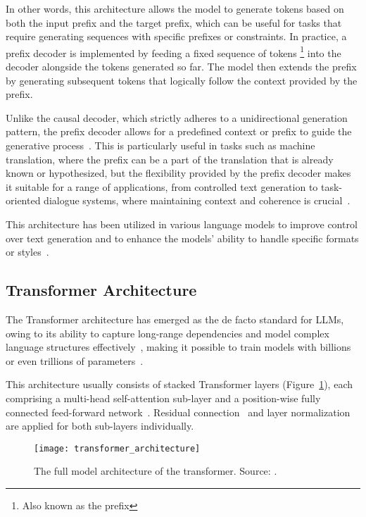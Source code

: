 In other words, this architecture allows the model to generate tokens based on both the input prefix and the target prefix, which can be useful for tasks that require generating sequences with specific prefixes or constraints.
In practice, a prefix decoder is implemented by feeding a fixed sequence of tokens \footnote{Also known as the prefix} into the decoder alongside the tokens generated so far.
The model then extends the prefix by generating subsequent tokens that logically follow the context provided by the prefix.

Unlike the causal decoder, which strictly adheres to a unidirectional generation pattern, the prefix decoder allows for a predefined context or prefix to guide the generative process~\cite{li2021prefixtuning}.
This is particularly useful in tasks such as machine translation, where the prefix can be a part of the translation that is already known or hypothesized, but the flexibility provided by the prefix decoder makes it suitable for a range of applications, from controlled text generation to task-oriented dialogue systems, where maintaining context and coherence is crucial~\cite{li2022ptuning}.

This architecture has been utilized in various language models to improve control over text generation and to enhance the models' ability to handle specific formats or styles~\cite{raffel2023exploring}.

\subsection{Transformer Architecture}
\label{subsec:transformer-architecture}

The Transformer architecture has emerged as the de facto standard for LLMs, owing to its ability to capture long-range dependencies and model complex language structures effectively~\cite{vaswani2023attention}, making it possible to train models with billions or even trillions of parameters~\cite{brown2020language, touvron2023llama}.

This architecture usually consists of stacked Transformer layers (Figure~\ref{fig:architecture}), each comprising a multi-head self-attention sub-layer and a position-wise fully connected feed-forward network~\cite{vaswani2023attention}.
Residual connection~\cite{he2016deep} and layer normalization~\cite{ba2016layer} are applied for both sub-layers individually.

\begin{figure}[H]
	\centering
	\texttt{[image: transformer\_architecture]}
	\caption{The full model architecture of the transformer. Source: \textcite{weng2018attention}.}
	\label{fig:architecture}
\end{figure}

